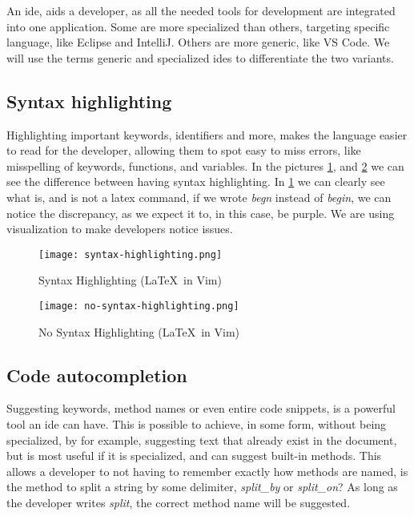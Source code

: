 An \gls*{ide}, aids a developer, as all the needed tools for development are
integrated into one application. Some are more specialized than others,
targeting specific language, like Eclipse and IntelliJ. Others are
more generic, like VS Code. We will use the terms generic and specialized
\gls*{ide}s to differentiate the two variants.


\subsection{Syntax highlighting}

Highlighting important keywords, identifiers and more, makes the language easier
to read for the developer, allowing them to spot easy to miss errors, like
misspelling of keywords, functions, and variables. In the pictures
\ref{pic:stx}, and \ref{pic:noStx} we can see the difference between having
syntax highlighting. In \ref{pic:stx} we can clearly see what is, and is not a
latex command, if we wrote \textit{begn} instead of \textit{begin}, we can
notice the discrepancy, as we expect it to, in this case, be purple. We are
using visualization to make developers notice issues.

\begin{figure}
  \centering
  \texttt{[image: syntax-highlighting.png]}
  \caption{Syntax Highlighting (\LaTeX\ in Vim)}
  \label{pic:stx}
\end{figure}

\begin{figure}
  \centering
  \texttt{[image: no-syntax-highlighting.png]}
  \caption{No Syntax Highlighting (\LaTeX\ in Vim)}
  \label{pic:noStx}
\end{figure}

\subsection{Code autocompletion}

Suggesting keywords, method names or even entire code snippets, is a powerful
tool an \gls*{ide} can have. This is possible to achieve, in some form, without
being specialized, by for example, suggesting text that already exist in the
document, but is most useful if it is specialized, and can suggest built-in
methods. This allows a developer to not having to remember exactly how methods
are named, is the method to split a string by some delimiter, \textit{split\_by}
or \textit{split\_on}? As long as the developer writes \textit{split}, the
correct method name will be suggested.

